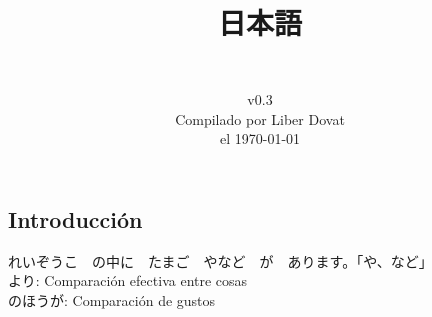 \documentclass[a4paper,12pt,oneside]{report}
\begin{document}
\begin{CJK*}{UTF8}{min}%



  \title{
    \begin{flushright}
      \Huge  日本語\\
      \LARGE {}
    \end{flushright}
  } %

  \author{\vspace{7cm}\\
    v0.3\\
    Compilado por Liber Dovat\\
    el \today\\
  } %

  \date{}
  \maketitle

  \newpage


  \tableofcontents
  \thispagestyle{plain}

  \newpage




  \chapter{Introducci\'on}
  \thispagestyle{contenido} %
  \pagestyle{contenido}     %

    れいぞうこ　の中に　たまご　やなど　が　あります。「や、など」
    \\

    より: Comparación efectiva entre cosas
    \\

    のほうが: Comparación de gustos
    \\




\end{CJK*}
\end{document}
